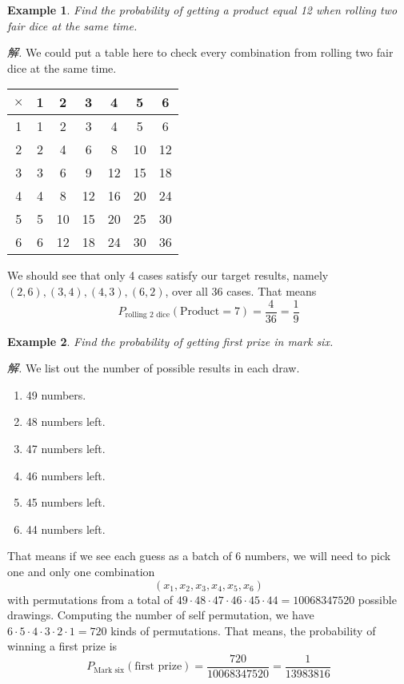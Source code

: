 \documentclass[12pt]{article}
\newtheorem{example}{Example}
\begin{document}
    \begin{example}
        Find the probability of getting a product equal 12 when rolling two fair dice at the same time. 
    \end{example}

    \textit{ 解.} We could put a table here to check every combination from rolling two fair dice at the same time.
    \begin{center}
        \begin{tabular}{c||c|c|c|c|c|c}
            $\times$&1&2&3&4&5&6\\
            \hline
            \hline
            1&1&2&3&4&5&6\\
            \hline
            2&2&4&6&8&10&12\\
            \hline
            3&3&6&9&12&15&18\\
            \hline
            4&4&8&12&16&20&24\\
            \hline
            5&5&10&15&20&25&30\\
            \hline
            6&6&12&18&24&30&36\\
        \end{tabular}
    \end{center} 
    We should see that only 4 cases satisfy our target results, namely $(2,6),(3,4),(4,3),(6,2)$, over all 36 cases. That means $$P_{\textrm{rolling 2 dice}}(\textrm{Product}=7)=\frac{4}{36}=\frac{1}{9}$$

    \begin{example}
        Find the probability of getting first prize in mark six.
    \end{example}

    \textit{ 解.} We list out the number of possible results in each draw.\begin{enumerate}
        \item 49 numbers.
        \item 48 numbers left.
        \item 47 numbers left.
        \item 46 numbers left.
        \item 45 numbers left.
        \item 44 numbers left.
    \end{enumerate}
    That means if we see each guess as a batch of 6 numbers, we will need to pick one and only one combination $$(x_1,x_2,x_3,x_4,x_5,x_6)$$
    with permutations from a total of $49\cdot48\cdot47\cdot46\cdot45\cdot44=10068347520$ possible drawings. Computing the number of self permutation, we have $6\cdot5\cdot4\cdot3\cdot2\cdot1=720$ kinds of permutations. That means, the probability of winning a first prize is $$P_{\textrm{Mark six}}(\textrm{first prize})=\frac{720}{10068347520}=\frac{1}{13983816}$$
\end{document}

